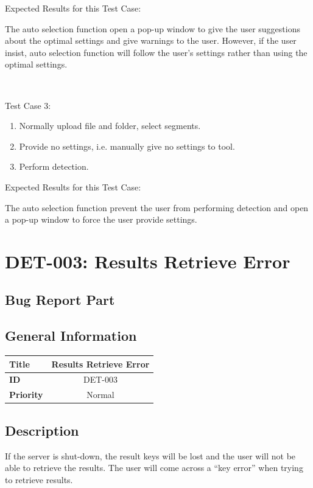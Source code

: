 \documentclass[twoside,a4paper]{refart}
\newcommand{\bugthird}{DET-003: Results Retrieve Error}
\begin{document}
Expected Results for this Test Case: 

The auto selection function open a pop-up window to give the user suggestions about the optimal settings and give warnings to the user. However, if the user insist, auto selection function will follow the user's settings rather than using the optimal settings.

$\ $

Test Case 3:

\begin{enumerate}
\item Normally upload file and folder, select segments.
\item Provide no settings, i.e. manually give no settings to tool.
\item Perform detection.
\end{enumerate}

Expected Results for this Test Case: 

The auto selection function prevent the user from performing detection and open a pop-up window to force the user provide settings.

\section{\bugthird}
\subsection{Bug Report Part}

\subsection*{General Information}
\begin{table}[!h]
\begin{tabular}{|l|c|}
\hline
\textbf{Title} & Results Retrieve Error \\ \hline
\textbf{ID} & DET-003 \\ \hline
\textbf{Priority} & Normal \\ \hline
\end{tabular}
\end{table}

\subsection*{Description}
If the server is shut-down, the result keys will be lost and the user will not be able to retrieve the results. The user will come across a \enquote{key error} when trying to retrieve results.
\end{document}
